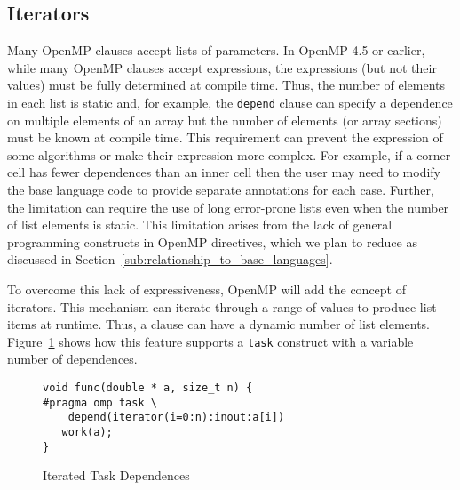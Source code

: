 \subsection{Iterators}
\label{sub:iterators}

Many OpenMP clauses accept lists of parameters. In OpenMP 4.5 or earlier, 
while many OpenMP clauses accept expressions, the expressions (but not 
their values) must be fully determined at compile time. Thus, the number 
of elements in each list is static and, for example, the \texttt{depend} 
clause can specify a dependence on multiple elements of an array but the 
number of elements (or array sections) must be known at compile time. This 
requirement can prevent the expression of some algorithms or make their 
expression more complex. For example, if a corner cell has fewer dependences 
than an inner cell then the user may need to modify the base language code 
to provide separate annotations for each case. Further, the limitation can 
require the use of long error-prone lists even when the number of list 
elements is static. This limitation arises from the lack of general 
programming constructs in OpenMP directives, which we plan to reduce as 
discussed in Section~\ref{sub:relationship_to_base_languages}.

To overcome this lack of expressiveness, OpenMP will add the concept of
iterators. This mechanism can iterate through a range of values to produce 
list-items at runtime. Thus, a clause can have a dynamic number of list 
elements. Figure~\ref{fig:iterators} shows how this feature supports a
\texttt{task} construct with a variable number of dependences.

\begin{figure}
\begin{verbatim}
void func(double * a, size_t n) {
#pragma omp task \
    depend(iterator(i=0:n):inout:a[i])
   work(a);
}
\end{verbatim}
\caption{Iterated Task Dependences\label{fig:iterators}}
\end{figure}

